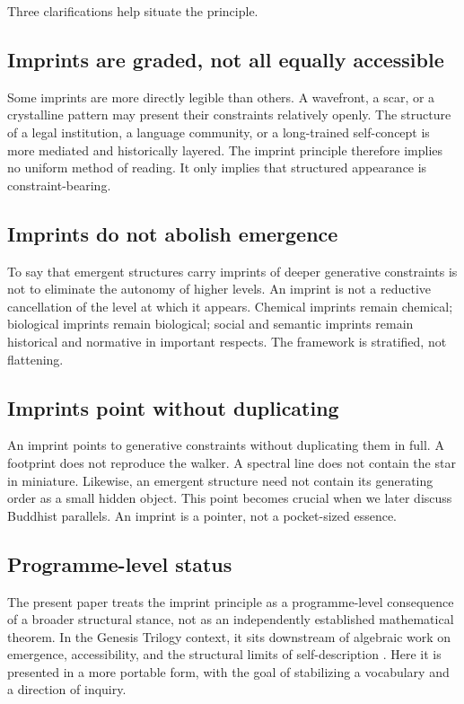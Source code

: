 \documentclass[12pt]{article}
\begin{document}
Three clarifications help situate the principle.

\subsection{Imprints are graded, not all equally accessible}

Some imprints are more directly legible than others. A wavefront, a scar, or a crystalline pattern may present their constraints relatively openly. The structure of a legal institution, a language community, or a long-trained self-concept is more mediated and historically layered. The imprint principle therefore implies no uniform method of reading. It only implies that structured appearance is constraint-bearing.

\subsection{Imprints do not abolish emergence}

To say that emergent structures carry imprints of deeper generative constraints is not to eliminate the autonomy of higher levels. An imprint is not a reductive cancellation of the level at which it appears. Chemical imprints remain chemical; biological imprints remain biological; social and semantic imprints remain historical and normative in important respects. The framework is stratified, not flattening.

\subsection{Imprints point without duplicating}

An imprint points to generative constraints without duplicating them in full. A footprint does not reproduce the walker. A spectral line does not contain the star in miniature. Likewise, an emergent structure need not contain its generating order as a small hidden object. This point becomes crucial when we later discuss Buddhist parallels. An imprint is a pointer, not a pocket-sized essence.

\subsection{Programme-level status}

The present paper treats the imprint principle as a programme-level consequence of a broader structural stance, not as an independently established mathematical theorem. In the Genesis Trilogy context, it sits downstream of algebraic work on emergence, accessibility, and the structural limits of self-description \cite{Liu2026HAFF_A,Liu2026HAFF_G,Liu2026CS_III}. Here it is presented in a more portable form, with the goal of stabilizing a vocabulary and a direction of inquiry.
\end{document}
